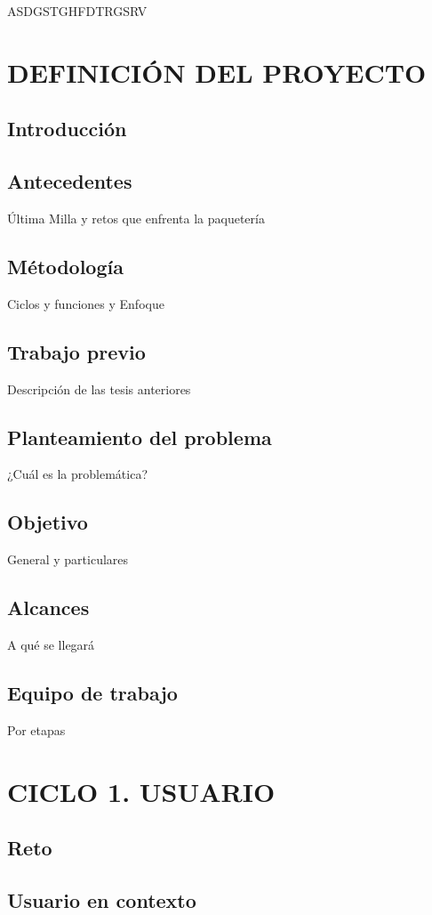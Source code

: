 \documentclass[12pt,letterpaper]{book}
\begin{document}
ASDGSTGHFDTRGSRV
\newpage

\tableofcontents

\chapter{DEFINICIÓN DEL PROYECTO}
\section{Introducción}
\section{Antecedentes}
Última Milla y retos que enfrenta la paquetería
\section{Métodología}
Ciclos y funciones y Enfoque
\section{Trabajo previo}
Descripción de las tesis anteriores
\section{Planteamiento del problema}
¿Cuál es la problemática?
\section{Objetivo}
General y particulares
\section{Alcances}
A qué se llegará
\section{Equipo de trabajo}
Por etapas
\newpage

\chapter{CICLO 1. USUARIO}
\section{Reto}
\section{Usuario en contexto}
\end{document}
